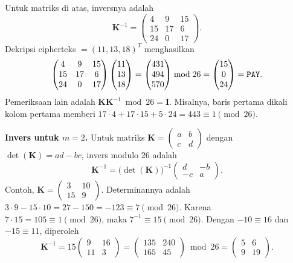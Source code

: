 Untuk matriks di atas, inversnya adalah
\[
\mathbf{K}^{-1} =
\begin{pmatrix}
4  & 9  & 15\\
15 & 17 & 6\\
24 & 0  & 17
\end{pmatrix}.
\]
Dekripsi cipherteks  $=(11,13,18)^T$ menghasilkan
\[
\begin{pmatrix}
4 & 9 & 15\\
15 & 17 & 6\\
24 & 0 & 17
\end{pmatrix}
\begin{pmatrix}11\\13\\18\end{pmatrix}
=
\begin{pmatrix}431\\494\\570\end{pmatrix}
\bmod 26
=
\begin{pmatrix}15\\0\\24\end{pmatrix}
=
\text{\texttt{PAY}}.
\]
Pemeriksaan lain adalah $\mathbf{KK}^{-1} \bmod 26 = \mathbf{I}$. Misalnya,
baris pertama dikali kolom pertama memberi
$17\cdot4+17\cdot15+5\cdot24=443 \equiv 1 \pmod{26}$.

\textbf{Invers untuk $m=2$.} Untuk matriks
$\mathbf{K}=\begin{pmatrix}a&b\\c&d\end{pmatrix}$ dengan
$\det(\mathbf{K})=ad-bc$, invers modulo 26 adalah
\[
\mathbf{K}^{-1} = \bigl(\det(\mathbf{K})\bigr)^{-1}
\begin{pmatrix} d & -b\\ -c & a\end{pmatrix}.
\]
Contoh, $\mathbf{K}=\begin{pmatrix}3&10\\15&9\end{pmatrix}$. Determinannya
adalah $3\cdot9-15\cdot10=27-150=-123 \equiv 7 \pmod{26}$. Karena
$7\cdot15=105 \equiv 1 \pmod{26}$, maka $7^{-1}\equiv15 \pmod{26}$. Dengan
$-10\equiv16$ dan $-15\equiv11$, diperoleh
\[
\mathbf{K}^{-1} = 15 \begin{pmatrix} 9 & 16\\ 11 & 3\end{pmatrix}
= \begin{pmatrix} 135 & 240\\ 165 & 45\end{pmatrix} \bmod 26
= \begin{pmatrix} 5 & 6\\ 9 & 19\end{pmatrix}.
\]

